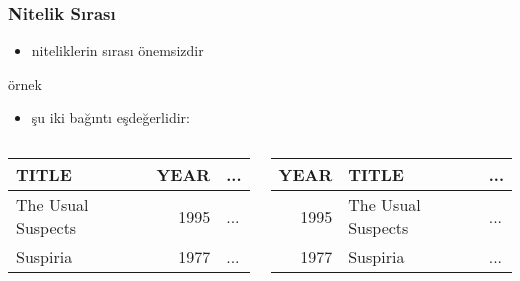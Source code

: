 \documentclass[dvipsnames]{beamer}
\theoremstyle{plain}
\begin{document}
\begin{frame}
  \frametitle{Nitelik Sırası}

  \begin{itemize}
    \item niteliklerin sırası önemsizdir
  \end{itemize}

  \medskip
  \begin{exampleblock}{örnek}
    \begin{itemize}
      \item şu iki bağıntı eşdeğerlidir:
    \end{itemize}

     \begin{columns}
      \begin{footnotesize}
      \begin{table}
        \begin{tabular}{|l|r|l|}\hline
TITLE              & YEAR & ...\\\hline\hline
The Usual Suspects & 1995 & ...\\\hline
Suspiria           & 1977 & ...\\\hline
        \end{tabular}
      \end{table}
      \end{footnotesize}

      \begin{footnotesize}
      \begin{table}
        \begin{tabular}{|r|l|l|}\hline
YEAR & TITLE              & ...\\\hline\hline
1995 & The Usual Suspects & ...\\\hline
1977 & Suspiria           & ...\\\hline
        \end{tabular}
      \end{table}
      \end{footnotesize}
    \end{columns}
  \end{exampleblock}
\end{frame}
\end{document}
